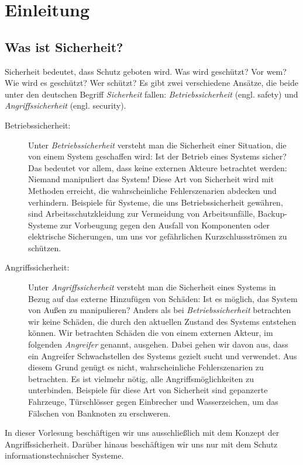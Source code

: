 \chapter{Einleitung}
\label{cha:intro}

\section{Was ist Sicherheit?}
Sicherheit bedeutet, dass Schutz geboten wird. Was wird geschützt? Vor
wem? Wie wird es geschützt? Wer schützt? Es gibt zwei verschiedene
Ansätze, die beide unter den deutschen Begriff \emph{Sicherheit} fallen:
\emph{Betriebssicherheit} (engl. safety) und \emph{Angriffssicherheit}
(engl. security).
\begin{description}
\item[Betriebssicherheit:] Unter \emph{Betriebssicherheit}
  versteht man die Sicherheit einer Situation, die von einem System
  geschaffen wird: Ist der Betrieb eines Systems sicher? Das bedeutet vor
  allem, dass keine externen Akteure betrachtet werden: Niemand
  manipuliert das System! Diese Art von Sicherheit wird mit Methoden
  erreicht, die wahrscheinliche Fehlerszenarien abdecken und
  verhindern. Beispiele für Systeme, die uns Betriebssicherheit gewähren,
  sind Arbeitsschutzkleidung zur Vermeidung von Arbeitsunfälle,
  Backup-Systeme zur Vorbeugung gegen den Ausfall von Komponenten oder
  elektrische Sicherungen, um uns vor gefährlichen Kurzschlussströmen zu
  schützen.
\item[Angriffssicherheit:] Unter \emph{Angriffssicherheit}
  versteht man die Sicherheit eines Systems in Bezug auf das externe
  Hinzufügen von Schäden: Ist es möglich, das System von Außen zu
  manipulieren? Anders als bei \emph{Betriebssicherheit} betrachten wir
  keine Schäden, die durch den aktuellen Zustand des Systems entstehen
  können. Wir betrachten Schäden die von einem externen Akteur, im
  folgenden \emph{Angreifer} genannt, ausgehen. Dabei gehen wir davon aus,
  dass ein Angreifer Schwachstellen des Systems gezielt sucht und
  verwendet. Aus diesem Grund genügt es nicht, wahrscheinliche
  Fehlerszenarien zu betrachten. Es ist vielmehr nötig, alle
  Angriffsmöglichkeiten zu unterbinden. Beispiele für diese Art von
  Sicherheit sind gepanzerte Fahrzeuge, Türschlösser gegen Einbrecher und
  Wasserzeichen, um das Fälschen von Banknoten zu erschweren.
\end{description} 
In dieser Vorlesung beschäftigen wir uns
ausschließlich mit dem Konzept der Angriffssicherheit. Darüber hinaus
beschäftigen wir uns nur mit dem Schutz informationstechnischer Systeme.

